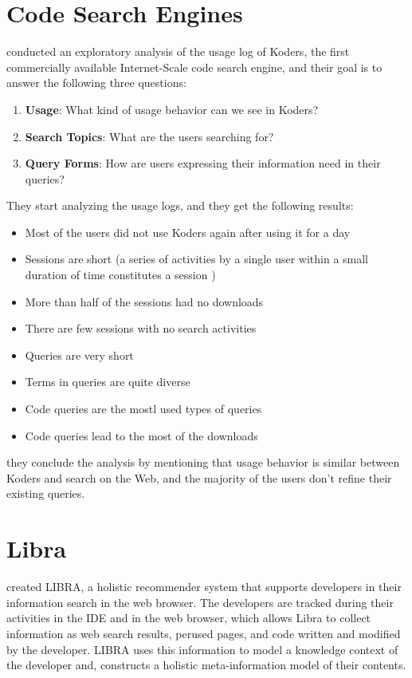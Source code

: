 \documentclass[12pt,mscthesis]{usiinfthesis}
\begin{document}
	\section{Code Search Engines}
	\citet{Bajracharya2012} conducted an exploratory analysis of the usage log of Koders, the first commercially available Internet-Scale code search engine, and their goal is to answer the following three questions:\\
	\begin{enumerate}
	\item \textbf{Usage}: What kind of usage behavior can we see in Koders?
	\item \textbf{Search Topics}: What are the users searching for?
	\item \textbf{Query Forms}: How are users expressing their information need in their queries?
	\end{enumerate}
	They start analyzing the usage logs, and they get the following results: 
	\begin{itemize}
	\item Most of the users did not use Koders again after using it for a day
	\item Sessions are short (a series of activities by a single user within a small duration of time constitutes a session )
	\item More than half of the sessions had no downloads
	\item There are few sessions with no search activities
	\item Queries are very short
	\item Terms in queries are quite diverse
	\item Code queries are the mostl used types of queries
	\item Code queries lead to the most of the downloads
	\end{itemize}
	they conclude the analysis by mentioning that usage behavior is similar between Koders and search on the Web, and the majority of the users don't refine their existing queries.\\
	\newpage
	
	\section{Libra}
	\citet{Ponz2017a} created LIBRA, a holistic recommender system that supports developers in their information search in the web browser. The developers are tracked during their activities in the IDE and in the web browser, which allows Libra to collect information as web search results, perused pages, and code written and modified by the developer. LIBRA uses this information to model a knowledge context of the developer and, constructs a holistic meta-information model of their contents.\\
	
\end{document}
